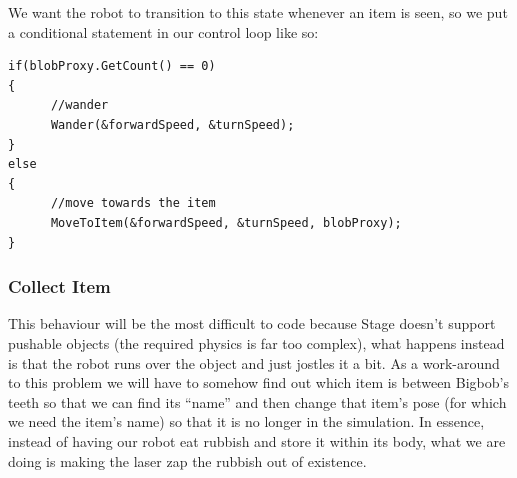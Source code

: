 \documentclass[a4paper]{article}
\begin{document}
We want the robot to transition to this state whenever an item is seen, so we put a conditional statement in our control loop like so:
\begin{verbatim}
if(blobProxy.GetCount() == 0)
{
      //wander
      Wander(&forwardSpeed, &turnSpeed);
}
else
{
      //move towards the item
      MoveToItem(&forwardSpeed, &turnSpeed, blobProxy);
}
\end{verbatim}

\subsubsection{Collect Item}
This behaviour will be the most difficult to code because Stage doesn't support pushable objects (the required physics is far too complex), what happens instead is that the robot runs over the object and just jostles it a bit. 
As a work-around to this problem we will have to somehow find out which item is between Bigbob's teeth so that we can find its ``name'' and then change that item's pose (for which we need the item's name) so that it is no longer in the simulation. In essence, instead of having our robot eat rubbish and store it within its body, what we are doing is making the laser zap the rubbish out of existence.
\end{document}

